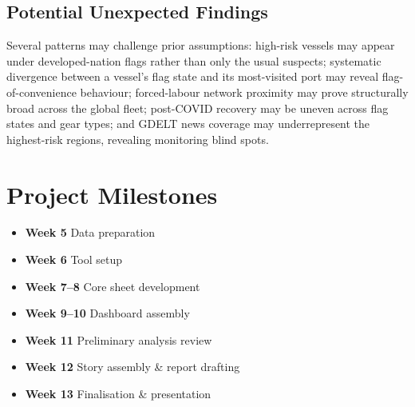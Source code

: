 \documentclass[sigconf]{acmart}
\begin{document}
\subsection{Potential Unexpected Findings}
Several patterns may challenge prior assumptions: high-risk vessels may appear under developed-nation flags rather than only the usual suspects; systematic divergence between a vessel's flag state and its most-visited port may reveal flag-of-convenience behaviour; forced-labour network proximity may prove structurally broad across the global fleet; post-COVID recovery may be uneven across flag states and gear types; and GDELT news coverage may underrepresent the highest-risk regions, revealing monitoring blind spots.

\section{Project Milestones}
\begin{itemize}
    \item \textbf{Week 5} Data preparation
    \item \textbf{Week 6} Tool setup
    \item \textbf{Week 7--8} Core sheet development
    \item \textbf{Week 9--10} Dashboard assembly
    \item \textbf{Week 11} Preliminary analysis review
    \item \textbf{Week 12} Story assembly \& report drafting
    \item \textbf{Week 13} Finalisation \& presentation
\end{itemize}

\newpage


\end{document}
